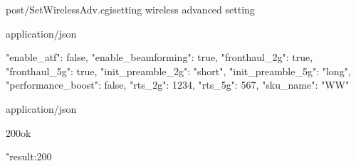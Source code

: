\documentclass[12pt,a4paper]{article}
\begin{document}
\begin{apiRoute}{post}{/SetWirelessAdv.cgi}{setting wireless advanced setting}
	\begin{routeParameter}
	
	\end{routeParameter}
	\begin{routeRequest}{application/json}
		\begin{routeRequestBody}
{
  "enable_atf": false,
  "enable_beamforming": true,
  "fronthaul_2g": true,
  "fronthaul_5g": true,
  "init_preamble_2g": "short",
  "init_preamble_5g": "long",
  "performance_boost": false,
  "rts_2g": 1234,
  "rts_5g": 567,
  "sku_name": "WW"
}
		\end{routeRequestBody}
	\end{routeRequest}
	\begin{routeResponse}{application/json}
		\begin{routeResponseItem}{200}{ok}
			\begin{routeResponseItemBody}
{     
	"result:200
}
			\end{routeResponseItemBody}
		\end{routeResponseItem}
	\end{routeResponse}
\end{apiRoute}
\end{document}
